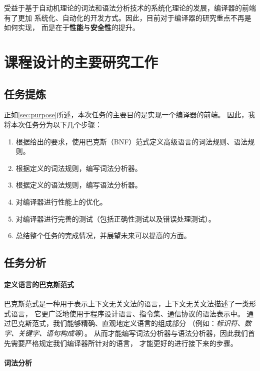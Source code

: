 受益于基于自动机理论的词法和语法分析技术的系统化理论的发展，编译器的前端有了更加
系统化、自动化的开发方式。因此，目前对于编译器的研究重点不再是如何实现，
而是在于{\bf 性能}与{\bf 安全性}的提升。\cite{Advanced-compiler-optim,53e9b0b2b7602d9703b20db9}

\section{课程设计的主要研究工作}

\subsection{任务提炼}

正如\autoref{sec:purpose}所述，本次任务的主要目的是实现一个编译器的前端。
因此，我将本次任务分为以下几个步骤：

\begin{enumerate}
	\item 根据给出的要求，使用巴克斯（BNF）范式定义高级语言的词法规则、语法规则。
	\item 根据定义的词法规则，编写词法分析器。
	\item 根据定义的语法规则，编写语法分析器。
	\item 对编译器进行性能上的优化。
	\item 对编译器进行完善的测试（包括正确性测试以及错误处理测试）。
	\item 总结整个任务的完成情况，并展望未来可以提高的方面。
\end{enumerate}

\subsection{任务分析}\label{subsec:analysis}

\paragraph{定义语言的巴克斯范式}

巴克斯范式是一种用于表示上下文无关文法的语言，上下文无关文法描述了一类形式语言，
它更广泛地使用于程序设计语言、指令集、通信协议的语法表示中。
通过巴克斯范式，我们能够精确、直观地定义语言的组成部分
（例如：{\it 标识符、数字、关键字、语句构成等}）。
从而才能编写词法分析器与语法分析器，因此我们首先需要严格规定我们编译器所针对的语言，
才能更好的进行接下来的步骤。

\paragraph{词法分析}

